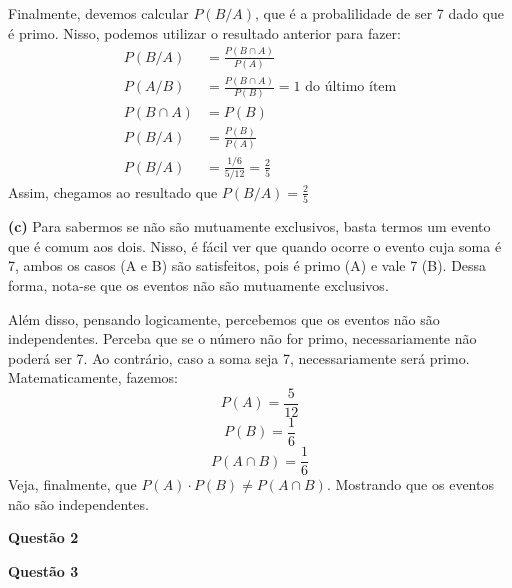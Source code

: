 \documentclass[11pt,a4paper]{article}
\begin{document}
Finalmente, devemos calcular $P(B/A)$, que é a probalilidade de ser 7 dado que é primo. Nisso, podemos utilizar o resultado anterior para fazer:
\begin{align*}
	P(B/A) &= \frac{P(B \cap A)}{P(A)}\\
	P(A/B) &= \frac{P(B \cap A)}{P(B)} = 1 \,\,\text{do último ítem}\\
	P(B \cap A) &= P(B)\\
	P(B/A) &= \frac{P(B)}{P(A)}\\
	P(B/A) &= \frac{1 / 6}{5 / 12} = \frac{2}{5}
\end{align*}
Assim, chegamos ao resultado que $P(B/A) = \frac{2}{5}$

\vspace{\baselineskip}

\noindent \textbf{(c)} Para sabermos se não são mutuamente exclusivos, basta termos um evento que é comum aos dois. Nisso, é fácil ver que quando ocorre o evento cuja soma é 7, ambos os casos (A e B) são satisfeitos, pois é primo (A) e vale 7 (B). Dessa forma, nota-se que os eventos não são mutuamente exclusivos.

Além disso, pensando logicamente, percebemos que os eventos não são independentes. Perceba que se o número não for primo, necessariamente não poderá ser 7. Ao contrário, caso a soma seja 7, necessariamente será primo. Matematicamente, fazemos:
\[P(A) = \frac{5}{12}\]
\[P(B) = \frac{1}{6}\]
\[P(A \cap B) = \frac{1}{6}\]
Veja, finalmente, que $P(A) \cdot P(B) \neq P(A \cap B)$. Mostrando que os eventos não são independentes.

\newpage

{\large{\textbf{Questão 2}}}

\newpage

{\large{\textbf{Questão 3}}}

\vspace{\baselineskip}

\end{document}
